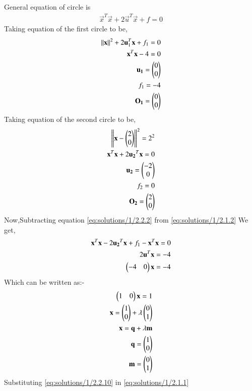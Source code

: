 General equation of circle is 
\begin{align}
{\vec{x}^T\vec{x}} + 2\vec{u}^T\vec{x} + f = 0
\end{align}
 Taking equation of the first circle to be,
 \begin{align}
 \left\lVert\mathbf{x}\right\rVert^2 + 2\mathbf{u}_1^T\mathbf{x} + f_1 = 0\label{eq:solutions/1/2.1.1}\\
 {\mathbf{x}^{T}\mathbf{x}}-4=0 \label{eq:solutions/1/2.1.2}\\
 \mathbf{u_1}=\begin{pmatrix}0\\0\end{pmatrix}\\
 f_1=-4\\
\mathbf{O_1}=\begin{pmatrix}0\\0\end{pmatrix}
 \end{align}
Taking equation of the second circle to be,
\begin{align}
  \left\lVert\mathbf{x}-\begin{pmatrix}2\\0\end{pmatrix}\right\rVert^2=2^2\\
  {\mathbf{x}^{T}\mathbf{x}+2\mathbf{u_2}^T\mathbf{x}}=0 \label{eq:solutions/1/2.2.2}\\
  \mathbf{u_2}=\begin{pmatrix}-2\\0\end{pmatrix}\\
 f_2=0\\
 \mathbf{O_2}=\begin{pmatrix}2\\0\end{pmatrix}
  \end{align}
 Now,Subtracting equation \eqref{eq:solutions/1/2.2.2} from \eqref{eq:solutions/1/2.1.2} We get,
 \begin{align}
 \mathbf{x}^T\mathbf{x}-2\mathbf{u_2}^T\mathbf{x}+f_1-\mathbf{x}^{T}\mathbf{x}=0\\
 2\mathbf{u}^{T}\mathbf{x}=-4\\
 \begin{pmatrix}-4&0\end{pmatrix}\mathbf{x}=-4
 \end{align}
 Which can be written as:-
 \begin{align}
 \begin{pmatrix}1&0\end{pmatrix}\mathbf{x}=1\\
 \mathbf{x}=\begin{pmatrix}1 \\ 0\end{pmatrix} + \lambda \begin{pmatrix}0\\1\end{pmatrix}\\
\mathbf{x}=\mathbf{q}+\lambda\mathbf{m}\label{eq:solutions/1/2.2.10}\\
\mathbf{q}=\begin{pmatrix}1 \\ 0\end{pmatrix} \\
\mathbf{m}=\begin{pmatrix}0\\1\end{pmatrix}
  \end{align}
 Substituting \eqref{eq:solutions/1/2.2.10} in \eqref{eq:solutions/1/2.1.1}
